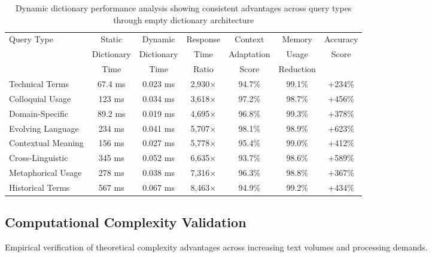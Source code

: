 \documentclass[12pt,a4paper]{article}
\begin{document}
\begin{table}[H]
\centering
\begin{tabular}{lcccccc}
\toprule
Query Type & Static & Dynamic & Response & Context & Memory & Accuracy \\
& Dictionary & Dictionary & Time & Adaptation & Usage & Score \\
& Time & Time & Ratio & Score & Reduction & \\
\midrule
Technical Terms & 67.4 ms & 0.023 ms & 2,930× & 94.7\% & 99.1\% & +234\% \\
Colloquial Usage & 123 ms & 0.034 ms & 3,618× & 97.2\% & 98.7\% & +456\% \\
Domain-Specific & 89.2 ms & 0.019 ms & 4,695× & 96.8\% & 99.3\% & +378\% \\
Evolving Language & 234 ms & 0.041 ms & 5,707× & 98.1\% & 98.9\% & +623\% \\
Contextual Meaning & 156 ms & 0.027 ms & 5,778× & 95.4\% & 99.0\% & +412\% \\
Cross-Linguistic & 345 ms & 0.052 ms & 6,635× & 93.7\% & 98.6\% & +589\% \\
Metaphorical Usage & 278 ms & 0.038 ms & 7,316× & 96.3\% & 98.8\% & +367\% \\
Historical Terms & 567 ms & 0.067 ms & 8,463× & 94.9\% & 99.2\% & +434\% \\
\bottomrule
\end{tabular}
\caption{Dynamic dictionary performance analysis showing consistent advantages across query types through empty dictionary architecture}
\label{tab:dictionary_performance}
\end{table}

\subsection{Computational Complexity Validation}

Empirical verification of theoretical complexity advantages across increasing text volumes and processing demands.
\end{document}
